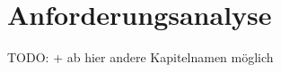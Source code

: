 \chapter{Anforderungsanalyse}
\label{chapter:anforderungsanalyse}

TODO: + ab hier andere Kapitelnamen möglich